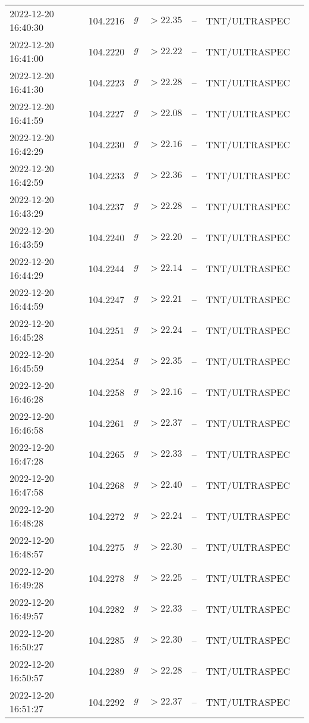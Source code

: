 \documentclass{nature_plusfigure}
\begin{document}
\begin{supplement}
\begin{center}
\begin{longtable}{lllllll}
2022-12-20 16:40:30 & 104.2216 & $g$ & $>22.35$ & -- & TNT/ULTRASPEC &  \\ 
2022-12-20 16:41:00 & 104.2220 & $g$ & $>22.22$ & -- & TNT/ULTRASPEC &  \\ 
2022-12-20 16:41:30 & 104.2223 & $g$ & $>22.28$ & -- & TNT/ULTRASPEC &  \\ 
2022-12-20 16:41:59 & 104.2227 & $g$ & $>22.08$ & -- & TNT/ULTRASPEC &  \\ 
2022-12-20 16:42:29 & 104.2230 & $g$ & $>22.16$ & -- & TNT/ULTRASPEC &  \\ 
2022-12-20 16:42:59 & 104.2233 & $g$ & $>22.36$ & -- & TNT/ULTRASPEC &  \\ 
2022-12-20 16:43:29 & 104.2237 & $g$ & $>22.28$ & -- & TNT/ULTRASPEC &  \\ 
2022-12-20 16:43:59 & 104.2240 & $g$ & $>22.20$ & -- & TNT/ULTRASPEC &  \\ 
2022-12-20 16:44:29 & 104.2244 & $g$ & $>22.14$ & -- & TNT/ULTRASPEC &  \\ 
2022-12-20 16:44:59 & 104.2247 & $g$ & $>22.21$ & -- & TNT/ULTRASPEC &  \\ 
2022-12-20 16:45:28 & 104.2251 & $g$ & $>22.24$ & -- & TNT/ULTRASPEC &  \\ 
2022-12-20 16:45:59 & 104.2254 & $g$ & $>22.35$ & -- & TNT/ULTRASPEC &  \\ 
2022-12-20 16:46:28 & 104.2258 & $g$ & $>22.16$ & -- & TNT/ULTRASPEC &  \\ 
2022-12-20 16:46:58 & 104.2261 & $g$ & $>22.37$ & -- & TNT/ULTRASPEC &  \\ 
2022-12-20 16:47:28 & 104.2265 & $g$ & $>22.33$ & -- & TNT/ULTRASPEC &  \\ 
2022-12-20 16:47:58 & 104.2268 & $g$ & $>22.40$ & -- & TNT/ULTRASPEC &  \\ 
2022-12-20 16:48:28 & 104.2272 & $g$ & $>22.24$ & -- & TNT/ULTRASPEC &  \\ 
2022-12-20 16:48:57 & 104.2275 & $g$ & $>22.30$ & -- & TNT/ULTRASPEC &  \\ 
2022-12-20 16:49:28 & 104.2278 & $g$ & $>22.25$ & -- & TNT/ULTRASPEC &  \\ 
2022-12-20 16:49:57 & 104.2282 & $g$ & $>22.33$ & -- & TNT/ULTRASPEC &  \\ 
2022-12-20 16:50:27 & 104.2285 & $g$ & $>22.30$ & -- & TNT/ULTRASPEC &  \\ 
2022-12-20 16:50:57 & 104.2289 & $g$ & $>22.28$ & -- & TNT/ULTRASPEC &  \\ 
2022-12-20 16:51:27 & 104.2292 & $g$ & $>22.37$ & -- & TNT/ULTRASPEC &  \\ 

\end{longtable}
\end{center}
\end{supplement}
\end{document}
